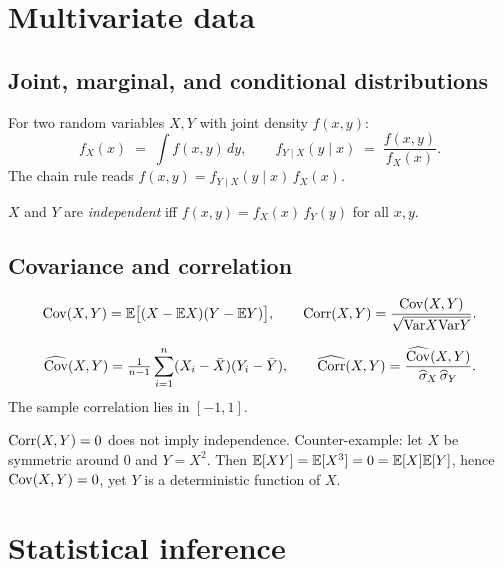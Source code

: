 \section{Multivariate data}
\label{sec:multivariate}

\subsection{Joint, marginal, and conditional distributions}

\begin{defbox}
For two random variables $X, Y$ with joint density $f(x, y)$:
\[
  f_X(x) \;=\; \int f(x, y)\, dy,
  \qquad
  f_{Y \mid X}(y \mid x) \;=\; \frac{f(x, y)}{f_X(x)}.
\]
The chain rule reads $f(x, y) = f_{Y \mid X}(y \mid x)\, f_X(x)$.
\end{defbox}

\begin{defbox}[Independence]
$X$ and $Y$ are \emph{independent} iff $f(x, y) = f_X(x)\, f_Y(y)$ for
all $x, y$.
\end{defbox}

\subsection{Covariance and correlation}

\begin{defbox}
\[
  \mathrm{Cov}(X, Y) = \mathbb{E}\bigl[(X - \mathbb{E} X)(Y - \mathbb{E} Y)\bigr],
  \qquad
  \mathrm{Corr}(X, Y) = \frac{\mathrm{Cov}(X, Y)}{\sqrt{\mathrm{Var} X \mathrm{Var} Y}}.
\]
\end{defbox}

\begin{propbox}
\[
  \widehat{\mathrm{Cov}}(X, Y) = \tfrac{1}{n - 1}\sum_{i=1}^{n}
    (X_i - \bar X)(Y_i - \bar Y),
  \qquad
  \widehat{\mathrm{Corr}}(X, Y) = \frac{\widehat{\mathrm{Cov}}(X, Y)}{\widehat{\sigma}_X\,\widehat{\sigma}_Y}.
\]
The sample correlation lies in $[-1, 1]$.
\end{propbox}

\begin{warnbox}
$\mathrm{Corr}(X, Y) = 0$ does not imply independence. Counter-example: let
$X$ be symmetric around $0$ and $Y = X^2$. Then $\mathbb{E}[XY] = \mathbb{E}[X^3] = 0
= \mathbb{E}[X]\mathbb{E}[Y]$, hence $\mathrm{Cov}(X, Y) = 0$, yet $Y$ is a deterministic
function of $X$.
\end{warnbox}

\section{Statistical inference}
\label{sec:inference}

